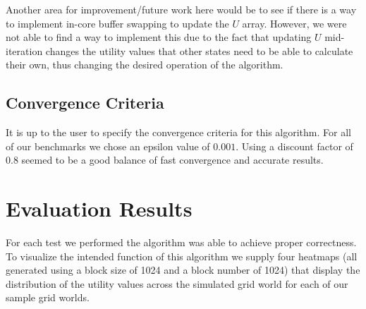 \documentclass[letterpaper,twocolumn,10pt]{article}
\begin{document}
{Another area for improvement/future work here would be to see if there is a way to implement in-core buffer swapping to update the $U$ array. However, we were not able to find a way to implement this due to the fact that updating $U$ mid-iteration changes the utility values that other states need to be able to calculate their own, thus changing the desired operation of the algorithm.

\subsection{Convergence Criteria}

It is up to the user to specify the convergence criteria for this algorithm. For all of our benchmarks we chose an epsilon value of $0.001$. Using a discount factor of $0.8$ seemed to be a good balance of fast convergence and accurate results.

\section{Evaluation Results}

For each test we performed the algorithm was able to achieve proper correctness. To visualize the intended function of this algorithm we supply four heatmaps (all generated using a block size of 1024 and a block number of 1024) that display the distribution of the utility values across the simulated grid world for each of our sample grid worlds. 

}
\end{document}
